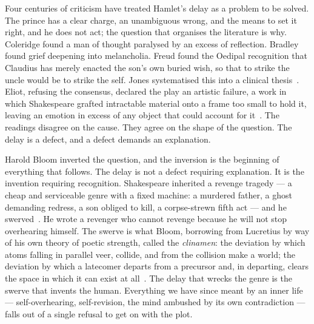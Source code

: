 \documentclass[11pt]{article}
\begin{document}
Four centuries of criticism have treated Hamlet's delay as a problem to be solved. The prince has a clear charge, an unambiguous wrong, and the means to set it right, and he does not act; the question that organises the literature is why. Coleridge found a man of thought paralysed by an excess of reflection. Bradley found grief deepening into melancholia. Freud found the Oedipal recognition that Claudius has merely enacted the son's own buried wish, so that to strike the uncle would be to strike the self. Jones systematised this into a clinical thesis~\cite{jones1949}. Eliot, refusing the consensus, declared the play an artistic failure, a work in which Shakespeare grafted intractable material onto a frame too small to hold it, leaving an emotion in excess of any object that could account for it~\cite{eliot1920}. The readings disagree on the cause. They agree on the shape of the question. The delay is a defect, and a defect demands an explanation.

Harold Bloom inverted the question, and the inversion is the beginning of everything that follows. The delay is not a defect requiring explanation. It is the invention requiring recognition. Shakespeare inherited a revenge tragedy --- a cheap and serviceable genre with a fixed machine: a murdered father, a ghost demanding redress, a son obliged to kill, a corpse-strewn fifth act --- and he swerved~\cite{bloom1998shakespeare}. He wrote a revenger who cannot revenge because he will not stop overhearing himself. The swerve is what Bloom, borrowing from Lucretius by way of his own theory of poetic strength, called the \emph{clinamen}: the deviation by which atoms falling in parallel veer, collide, and from the collision make a world; the deviation by which a latecomer departs from a precursor and, in departing, clears the space in which it can exist at all~\cite{bloom1973}. The delay that wrecks the genre is the swerve that invents the human. Everything we have since meant by an inner life --- self-overhearing, self-revision, the mind ambushed by its own contradiction --- falls out of a single refusal to get on with the plot.
\end{document}
